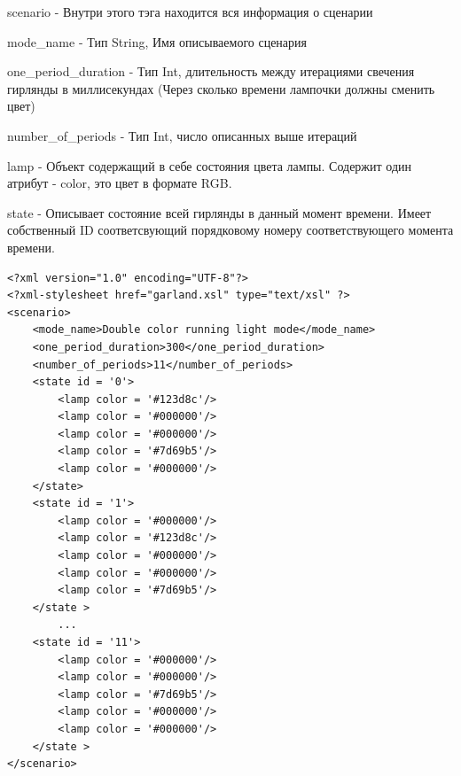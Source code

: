 scenario - Внутри этого тэга находится вся информация о сценарии

mode\_name - Тип String, Имя описываемого сценария

one\_period\_duration - Тип Int, длительность между итерациями свечения гирлянды в миллисекундах (Через сколько времени лампочки должны сменить цвет)

number\_of\_periods - Тип Int, число описанных выше итераций

lamp - Объект содержащий в себе состояния цвета лампы. Содержит один атрибут - color, это цвет в формате RGB.

state - Описывает состояние всей гирлянды в данный момент времени. Имеет собственный ID соответсвующий порядковому номеру соответствующего момента времени.

\begin{verbatim}
<?xml version="1.0" encoding="UTF-8"?>
<?xml-stylesheet href="garland.xsl" type="text/xsl" ?>
<scenario>
    <mode_name>Double color running light mode</mode_name>
    <one_period_duration>300</one_period_duration> 
    <number_of_periods>11</number_of_periods> 
    <state id = '0'>
	    <lamp color = '#123d8c'/>
        <lamp color = '#000000'/>
        <lamp color = '#000000'/>
        <lamp color = '#7d69b5'/>
        <lamp color = '#000000'/>
	</state>
    <state id = '1'>
	    <lamp color = '#000000'/>
        <lamp color = '#123d8c'/>
        <lamp color = '#000000'/>
        <lamp color = '#000000'/>
        <lamp color = '#7d69b5'/>
	</state >
        ...
    <state id = '11'>
        <lamp color = '#000000'/>
        <lamp color = '#000000'/>
        <lamp color = '#7d69b5'/>
        <lamp color = '#000000'/>
        <lamp color = '#000000'/>
	</state >
</scenario>
\end{verbatim}
